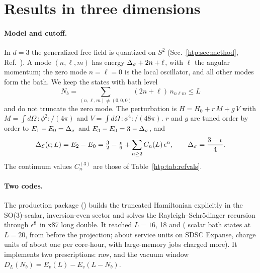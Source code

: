 \section{Results in three dimensions}\label{htp:d3:sec}

\paragraph{Model and cutoff.}
In $d=3$ the generalized free field is quantized on $S^2$ (Sec.~\ref{htp:sec:method}, Ref.~\cite{htp:Hogervorst:2014rta}). A
mode $(n,\ell,m)$ has energy $\Delta_\sigma+2n+\ell$, with $\ell$ the angular momentum; the zero mode $n=\ell=0$ is the local
oscillator, and all other modes form the bath. We keep the states with bath level
\begin{equation}
 N_b=\sum_{(n,\ell,m)\neq(0,0,0)}(2n+\ell)\,n_{n\ell m}\le L
 \label{htp:d3:eq:cutoff}
\end{equation}
and do not truncate the zero mode. The perturbation is $H=H_0+r\,M+g\,V$ with
$M=\int d\Omega\,{:}\phi^2{:}/(4\pi)$ and $V=\int d\Omega\,{:}\phi^4{:}/(48\pi)$. $r$ and $g$ are tuned order by order
to $E_1-E_0=\Delta_\sigma$ and $E_3-E_0=3-\Delta_\sigma$, and
\begin{equation}
 \Delta_{\mathcal E}(\epsilon;L)=E_2-E_0=\tfrac32-\tfrac{\epsilon}{6}+\sum_{n\ge2}C_n(L)\,\epsilon^n,\qquad \Delta_\sigma=\frac{3-\epsilon}{4}.
 \label{htp:d3:eq:Cn}
\end{equation}
The continuum values $C_n^{(3)}$ are those of Table~\ref{htp:tab:refvals}.

\paragraph{Two codes.}
The production package () builds the truncated Hamiltonian explicitly in the SO(3)-scalar,
inversion-even sector and solves the Rayleigh--Schr\"odinger recursion through $\epsilon^8$ in x87 long double. It reached
$L=16$, 18 and \HTpThreeLmax{} (\NThreeScalarTwenty{} scalar bath states at $L=20$, from \NThreeStatesTwenty{} before
the projection; about \NThreeSU{} service units on SDSC Expanse, charge units of about one per core-hour, with
large-memory jobs charged more). It implements two prescriptions: raw, and the vacuum window
$D_L(N_b)=E_v(L)-E_v(L-N_b)$.

